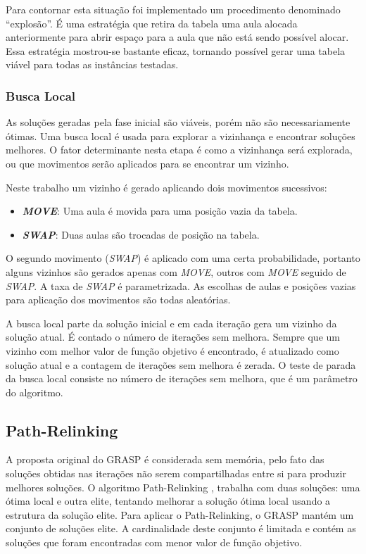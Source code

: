 \documentclass[11pt]{article}
\begin{document}
Para contornar esta situação foi implementado um procedimento denominado “explosão”. É uma estratégia que retira da tabela uma aula alocada anteriormente para abrir espaço para a aula que não está sendo possível alocar. Essa estratégia mostrou-se bastante eficaz, tornando possível gerar uma tabela viável para todas as instâncias testadas.

\subsubsection{Busca Local}

As soluções geradas pela fase inicial são viáveis, porém não são necessariamente ótimas. Uma busca local é usada para explorar a vizinhança e encontrar soluções melhores. O fator determinante nesta etapa é como a vizinhança será explorada, ou que movimentos serão aplicados para se encontrar um vizinho.

Neste trabalho um vizinho é gerado aplicando dois movimentos sucessivos:

\begin{itemize}
\item \textit{\textbf{MOVE}}: Uma aula é movida para uma posição vazia da tabela.
\item \textit{\textbf{SWAP}}: Duas aulas são trocadas de posição na tabela.
\end{itemize}

O segundo movimento (\textit{SWAP}) é aplicado com uma certa probabilidade, portanto alguns vizinhos são gerados apenas com \textit{MOVE}, outros com \textit{MOVE} seguido de \textit{SWAP}. A taxa de \textit{SWAP} é parametrizada. As escolhas de aulas e posições vazias para aplicação dos movimentos são todas aleatórias.

A busca local parte da solução inicial e em cada iteração gera um vizinho da solução atual. É contado o número de iterações sem melhora. Sempre que um vizinho com melhor valor de função objetivo é encontrado, é atualizado como solução atual e a contagem de iterações sem melhora é zerada. O teste de parada da busca local consiste no número de iterações sem melhora, que é um parâmetro do algoritmo. 

\subsection{Path-Relinking}

A proposta original do GRASP é considerada sem memória, pelo fato das soluções obtidas nas iterações não serem compartilhadas entre si para produzir melhores soluções. O algoritmo Path-Relinking \cite{Glover96tabusearch}, \cite{pathRelinking} trabalha com duas soluções: uma ótima local e outra elite, tentando melhorar a solução ótima local usando a estrutura da solução elite. Para aplicar o Path-Relinking, o GRASP mantém um conjunto de soluções elite. A cardinalidade deste conjunto é limitada e contém as soluções que foram encontradas com menor valor de função objetivo.
\end{document}
